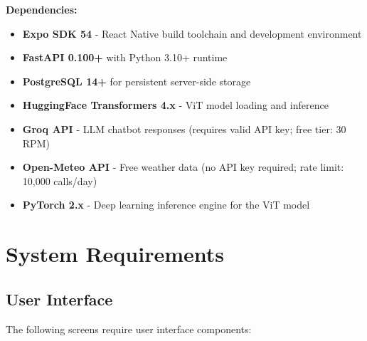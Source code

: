 \documentclass[12pt,a4paper]{article}
\begin{document}
\textbf{Dependencies:}
\begin{itemize}
    \item \textbf{Expo SDK 54} - React Native build toolchain and development environment
    \item \textbf{FastAPI 0.100+} with Python 3.10+ runtime
    \item \textbf{PostgreSQL 14+} for persistent server-side storage
    \item \textbf{HuggingFace Transformers 4.x} - ViT model loading and inference
    \item \textbf{Groq API} - LLM chatbot responses (requires valid API key; free tier: 30 RPM)
    \item \textbf{Open-Meteo API} - Free weather data (no API key required; rate limit: 10,000 calls/day)
    \item \textbf{PyTorch 2.x} - Deep learning inference engine for the ViT model
\end{itemize}

\section{System Requirements}

\subsection{User Interface}

The following screens require user interface components:
\end{document}
